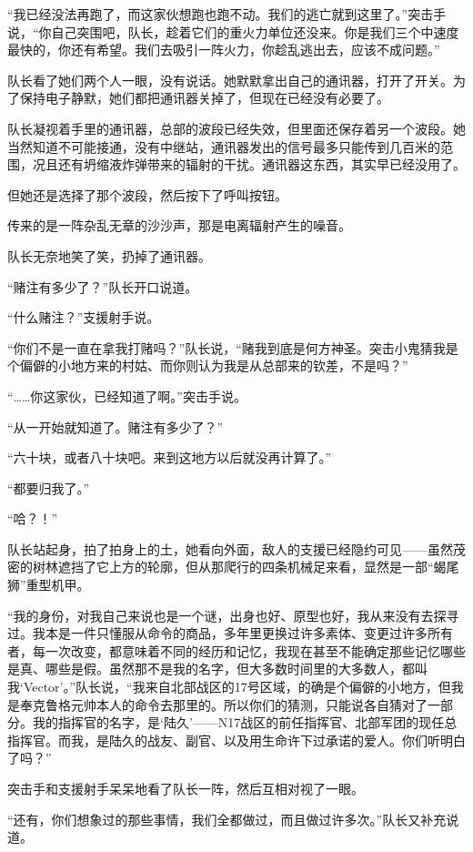 “我已经没法再跑了，而这家伙想跑也跑不动。我们的逃亡就到这里了。”突击手说，“你自己突围吧，队长，趁着它们的重火力单位还没来。你是我们三个中速度最快的，你还有希望。我们去吸引一阵火力，你趁乱逃出去，应该不成问题。”

队长看了她们两个人一眼，没有说话。她默默拿出自己的通讯器，打开了开关。为了保持电子静默，她们都把通讯器关掉了，但现在已经没有必要了。

队长凝视着手里的通讯器，总部的波段已经失效，但里面还保存着另一个波段。她当然知道不可能接通，没有中继站，通讯器发出的信号最多只能传到几百米的范围，况且还有坍缩液炸弹带来的辐射的干扰。通讯器这东西，其实早已经没用了。

但她还是选择了那个波段，然后按下了呼叫按钮。

传来的是一阵杂乱无章的沙沙声，那是电离辐射产生的噪音。

队长无奈地笑了笑，扔掉了通讯器。

“赌注有多少了？”队长开口说道。

“什么赌注？”支援射手说。

“你们不是一直在拿我打赌吗？”队长说，“赌我到底是何方神圣。突击小鬼猜我是个偏僻的小地方来的村姑、而你则认为我是从总部来的钦差，不是吗？”

“……你这家伙，已经知道了啊。”突击手说。

“从一开始就知道了。赌注有多少了？”

“六十块，或者八十块吧。来到这地方以后就没再计算了。”

“都要归我了。”

“哈？！”

队长站起身，拍了拍身上的土，她看向外面，敌人的支援已经隐约可见——虽然茂密的树林遮挡了它上方的轮廓，但从那爬行的四条机械足来看，显然是一部“蝎尾狮”重型机甲。

“我的身份，对我自己来说也是一个谜，出身也好、原型也好，我从来没有去探寻过。我本是一件只懂服从命令的商品，多年里更换过许多素体、变更过许多所有者，每一次改变，都意味着不同的经历和记忆，我现在甚至不能确定那些记忆哪些是真、哪些是假。虽然那不是我的名字，但大多数时间里的大多数人，都叫我‘Vector’。”队长说，“我来自北部战区的17号区域，的确是个偏僻的小地方，但我是奉克鲁格元帅本人的命令去那里的。所以你们的猜测，只能说各自猜对了一部分。我的指挥官的名字，是‘陆久’——N17战区的前任指挥官、北部军团的现任总指挥官。而我，是陆久的战友、副官、以及用生命许下过承诺的爱人。你们听明白了吗？”

突击手和支援射手呆呆地看了队长一阵，然后互相对视了一眼。

“还有，你们想象过的那些事情，我们全都做过，而且做过许多次。”队长又补充说道。

